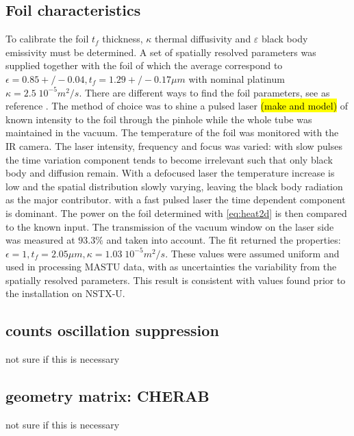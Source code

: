 \subsection{Foil characteristics}
To calibrate the foil $t_f$ thickness, $\kappa$ thermal diffusivity and $\varepsilon$ black body emissivity must be determined. A set of spatially resolved parameters was supplied together with the foil of which the average correspond to $\epsilon=0.85+/-0.04, t_f=1.29+/-0.17 \mu m$ with nominal platinum $\kappa=2.5\;10^{-5}m^2/s$. There are different ways to find the foil parameters, see as reference \cite{Itomi2014,Cernuschi2001,Mukai2016}. The method of choice was to shine a pulsed laser \hl{(make and model)} of known intensity to the foil through the pinhole while the whole tube was maintained in the vacuum. The temperature of the foil was monitored with the IR camera. The laser intensity, frequency and focus was varied: with slow pulses the time variation component tends to become irrelevant such that only black body and diffusion remain. With a defocused laser the temperature increase is low and the spatial distribution slowly varying, leaving the black body radiation as the major contributor. with a fast pulsed laser the time dependent component is dominant. The power on the foil determined with \autoref{eq:heat2d} is then compared to the known input. The transmission of the vacuum window on the laser side was measured at $93.3\%$ and taken into account. The fit returned the properties: $\epsilon=1, t_f=2.05 \mu m, \kappa=1.03\;10^{-5}m^2/s$. These values were assumed uniform and used in processing MASTU data, with as uncertainties the variability from the spatially resolved parameters. This result is consistent with values found prior to the installation on NSTX-U. \cite{Reinke2018}
\subsection{counts oscillation suppression}
not sure if this is necessary
\subsection{geometry matrix: CHERAB}
not sure if this is necessary
